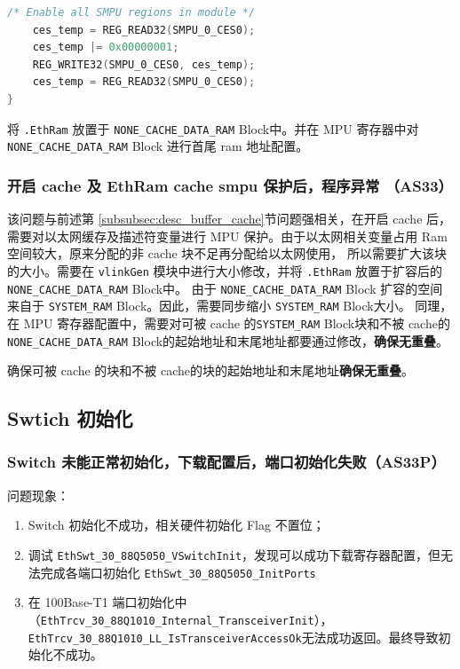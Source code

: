 \begin{lstlisting}[language=C,style=C]
    /* Enable all SMPU regions in module */
    ces_temp = REG_READ32(SMPU_0_CES0);
    ces_temp |= 0x00000001;
    REG_WRITE32(SMPU_0_CES0, ces_temp);
    ces_temp = REG_READ32(SMPU_0_CES0);
}
\end{lstlisting}

\begin{definition}[解决方案]
    将 \lstinline{.EthRam} 放置于 \lstinline{NONE_CACHE_DATA_RAM} Block中。并在 MPU 寄存器中对 \lstinline{NONE_CACHE_DATA_RAM} Block 进行首尾 ram 地址配置。
\end{definition}

\subsubsection{开启 cache 及 EthRam cache smpu 保护后，程序异常 （AS33）}\label{subsubsec:smpu_address_overlap}

该问题与前述第 \ref{subsubsec:desc_buffer_cache}节问题强相关，在开启 cache 后，需要对以太网缓存及描述符变量进行 MPU 保护。由于以太网相关变量占用 Ram空间较大，原来分配的非 cache 块不足再分配给以太网使用，
所以需要扩大该块的大小。需要在 \lstinline{vlinkGen} 模块中进行大小修改，并将 \lstinline{.EthRam} 放置于扩容后的 \lstinline{NONE_CACHE_DATA_RAM} Block中。
由于 \lstinline{NONE_CACHE_DATA_RAM} Block 扩容的空间来自于 \lstinline{SYSTEM_RAM} Block。因此，需要同步缩小 \lstinline{SYSTEM_RAM} Block大小。
同理，在 MPU 寄存器配置中，需要对可被 cache 的\lstinline{SYSTEM_RAM} Block块和不被 cache的 \lstinline{NONE_CACHE_DATA_RAM} Block的起始地址和末尾地址都要通过修改，\textbf{确保无重叠}。

\begin{definition}[解决方案]
    确保可被 cache 的块和不被 cache的块的起始地址和末尾地址\textbf{确保无重叠}。
\end{definition}

\subsection{Swtich 初始化}

\subsubsection{Switch 未能正常初始化，下载配置后，端口初始化失败（AS33P）}\label{subsubsec:switch_init_error1}

问题现象：
\begin{enumerate}
    \item Switch 初始化不成功，相关硬件初始化 Flag 不置位；
    \item 调试 \lstinline{EthSwt_30_88Q5050_VSwitchInit}，发现可以成功下载寄存器配置，但无法完成各端口初始化 \lstinline{EthSwt_30_88Q5050_InitPorts}
    \item 在 100Base-T1 端口初始化中（\lstinline{EthTrcv_30_88Q1010_Internal_TransceiverInit}），\lstinline{EthTrcv_30_88Q1010_LL_IsTransceiverAccessOk}无法成功返回。最终导致初始化不成功。
\end{enumerate}

